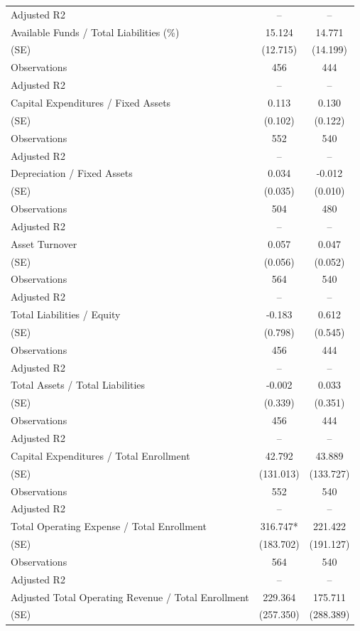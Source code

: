 \begin{table}[!htbp]
\begin{tabular}{lcc}
Adjusted R2 & -- & -- \\
Available Funds / Total Liabilities (\%) & 15.124 & 14.771 \\
(SE) & (12.715) & (14.199) \\
Observations & 456 & 444 \\
Adjusted R2 & -- & -- \\
Capital Expenditures / Fixed Assets & 0.113 & 0.130 \\
(SE) & (0.102) & (0.122) \\
Observations & 552 & 540 \\
Adjusted R2 & -- & -- \\
Depreciation / Fixed Assets & 0.034 & -0.012 \\
(SE) & (0.035) & (0.010) \\
Observations & 504 & 480 \\
Adjusted R2 & -- & -- \\
Asset Turnover & 0.057 & 0.047 \\
(SE) & (0.056) & (0.052) \\
Observations & 564 & 540 \\
Adjusted R2 & -- & -- \\
Total Liabilities / Equity & -0.183 & 0.612 \\
(SE) & (0.798) & (0.545) \\
Observations & 456 & 444 \\
Adjusted R2 & -- & -- \\
Total Assets / Total Liabilities & -0.002 & 0.033 \\
(SE) & (0.339) & (0.351) \\
Observations & 456 & 444 \\
Adjusted R2 & -- & -- \\
Capital Expenditures / Total Enrollment & 42.792 & 43.889 \\
(SE) & (131.013) & (133.727) \\
Observations & 552 & 540 \\
Adjusted R2 & -- & -- \\
Total Operating Expense / Total Enrollment & 316.747* & 221.422 \\
(SE) & (183.702) & (191.127) \\
Observations & 564 & 540 \\
Adjusted R2 & -- & -- \\
Adjusted Total Operating Revenue / Total Enrollment & 229.364 & 175.711 \\
(SE) & (257.350) & (288.389) \\

\end{tabular}
\end{table}
